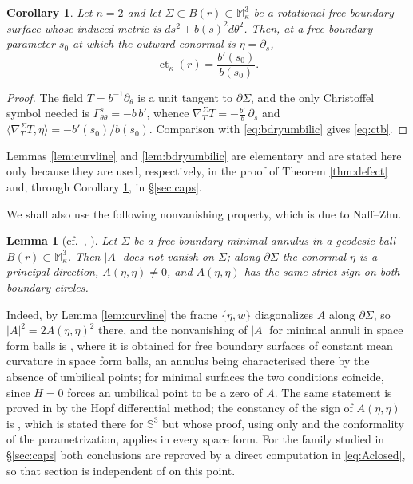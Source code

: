 \documentclass[10pt,a4paper]{amsart}
\newtheorem{lemma}[theorem]{Lemma}
\newtheorem{corollary}[theorem]{Corollary}
\newcommand{\M}{\mathbb{M}}
\newcommand{\Sph}{\mathbb{S}}
\newcommand{\ct}{\operatorname{ct}_\kappa}
\begin{document}
\begin{corollary}\label{cor:ctb}
Let $n=2$ and let $\Sigma\subset B(r)\subset\M^3_\kappa$ be a rotational free boundary surface whose induced metric is $ds^2+b(s)^2d\theta^2$. Then, at a free boundary parameter $s_0$ at which the outward conormal is $\eta=\partial_s$,
\begin{equation}\label{eq:ctb}
\ct(r)=\frac{b'(s_0)}{b(s_0)} .
\end{equation}
\end{corollary}

\begin{proof}
The field $T=b^{-1}\partial_\theta$ is a unit tangent to $\partial\Sigma$, and the only Christoffel symbol needed is $\Gamma^s_{\theta\theta}=-b\,b'$, whence $\nabla^\Sigma_TT=-\tfrac{b'}{b}\,\partial_s$ and $\langle\nabla^\Sigma_TT,\eta\rangle=-b'(s_0)/b(s_0)$. Comparison with \eqref{eq:bdryumbilic} gives \eqref{eq:ctb}.
\end{proof}

Lemmas \ref{lem:curvline} and \ref{lem:bdryumbilic} are elementary and are stated here only because they are used, respectively, in the proof of Theorem \ref{thm:defect} and, through Corollary \ref{cor:ctb}, in \S\ref{sec:caps}.

We shall also use the following nonvanishing property, which is due to Naff--Zhu.

\begin{lemma}[{cf.\ \cite[Cor.~4.4]{Santos}, \cite[Prop.~4.1 and Cor.~4.2]{NZ1}}]\label{lem:bdrycurv}
Let $\Sigma$ be a free boundary minimal annulus in a geodesic ball $B(r)\subset\M^3_\kappa$. Then $|A|$ does not vanish on $\Sigma$; along $\partial\Sigma$ the conormal $\eta$ is a principal direction, $A(\eta,\eta)\neq 0$, and $A(\eta,\eta)$ has the same strict sign on both boundary circles.
\end{lemma}

Indeed, by Lemma \ref{lem:curvline} the frame $\{\eta,w\}$ diagonalizes $A$ along $\partial\Sigma$, so $|A|^2=2A(\eta,\eta)^2$ there, and the nonvanishing of $|A|$ for minimal annuli in space form balls is \cite[Cor.~4.4]{Santos}, where it is obtained for free boundary surfaces of constant mean curvature in space form balls, an annulus being characterised there by the absence of umbilical points; for minimal surfaces the two conditions coincide, since $H=0$ forces an umbilical point to be a zero of $A$. The same statement is proved in \cite[Prop.~4.1]{NZ1} by the Hopf differential method; the constancy of the sign of $A(\eta,\eta)$ is \cite[Cor. 4.2]{NZ1}, which is stated there for $\Sph^3$ but whose proof, using only \cite[Prop. 4.1]{NZ1} and the conformality of the parametrization, applies in every space form. For the family studied in \S\ref{sec:caps} both conclusions are reproved by a direct computation in \eqref{eq:Aclosed}, so that section is independent of \cite{NZ1} on this point.
\end{document}
